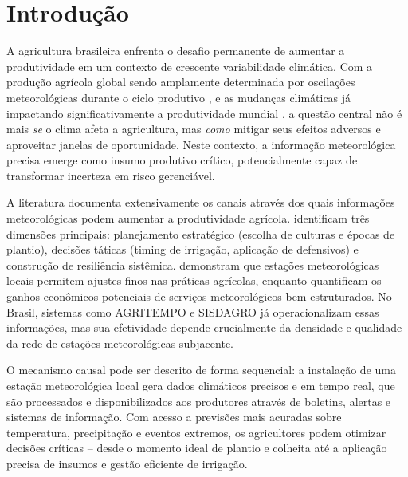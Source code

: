 \documentclass[
	12pt,				%
	oneside,			%
	a4paper,			%
	english,			%
	french,				%
	spanish,			%
	brazil				%
	]{abntex2}
\begin{document}
\chapter{Introdução}
\label{cap:introducao}

A agricultura brasileira enfrenta o desafio permanente de aumentar a produtividade em um contexto de crescente variabilidade climática. Com a produção agrícola global sendo amplamente determinada por oscilações meteorológicas durante o ciclo produtivo \cite{monteiro2009}, e as mudanças climáticas já impactando significativamente a produtividade mundial \cite{ortiz2020}, a questão central não é mais \textit{se} o clima afeta a agricultura, mas \textit{como} mitigar seus efeitos adversos e aproveitar janelas de oportunidade. Neste contexto, a informação meteorológica precisa emerge como insumo produtivo crítico, potencialmente capaz de transformar incerteza em risco gerenciável.

A literatura documenta extensivamente os canais através dos quais informações meteorológicas podem aumentar a produtividade agrícola.  identificam três dimensões principais: planejamento estratégico (escolha de culturas e épocas de plantio), decisões táticas (timing de irrigação, aplicação de defensivos) e construção de resiliência sistêmica.  demonstram que estações meteorológicas locais permitem ajustes finos nas práticas agrícolas, enquanto  quantificam os ganhos econômicos potenciais de serviços meteorológicos bem estruturados. No Brasil, sistemas como AGRITEMPO e SISDAGRO já operacionalizam essas informações, mas sua efetividade depende crucialmente da densidade e qualidade da rede de estações meteorológicas subjacente.

O mecanismo causal pode ser descrito de forma sequencial: a instalação de uma estação meteorológica local gera dados climáticos precisos e em tempo real, que são processados e disponibilizados aos produtores através de boletins, alertas e sistemas de informação. Com acesso a previsões mais acuradas sobre temperatura, precipitação e eventos extremos, os agricultores podem otimizar decisões críticas – desde o momento ideal de plantio e colheita até a aplicação precisa de insumos e gestão eficiente de irrigação. 
\end{document}
